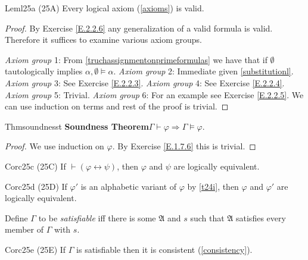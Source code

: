 \begin{reference}{Lem}{l25a}
  (25A) Every logical axiom (\ref{axioms}) is valid.
\end{reference}

\begin{proof}
  By Exercise \ref{E.2.2.6} any generalization of a valid formula is valid. Therefore it suffices to examine various axiom groups.

  \textit{Axiom group} 1: From \ref{truchassignmentonprimeformulas} we have that if $\emptyset$ tautologically implies $\alpha,\emptyset\vDash \alpha$.\newline
  \textit{Axiom group} 2: Immediate given \ref{substitutionl}.\newline
  \textit{Axiom group} 3: See Exercise \ref{E.2.2.3}.\newline
  \textit{Axiom group} 4: See Exercise \ref{E.2.2.4}.\newline
  \textit{Axiom group} 5: Trivial.\newline
  \textit{Axiom group} 6: For an example see Exercise \ref{E.2.2.5}. We can use induction on terms and rest of the proof is trivial.
\end{proof}

\begin{reference}{Thm}{soundnesst}
  \textbf{Soundness Theorem}\quad $\Gamma\vdash \varphi\Rightarrow \Gamma\vDash \varphi.$
\end{reference}

\begin{proof}
  We use induction on $\varphi$. By Exercise \ref{E.1.7.6} this is trivial.
\end{proof}

\begin{reference}{Cor}{c25c}
  (25C) If $\vdash(\varphi \leftrightarrow \psi)$, then $\varphi$ and $\psi$ are logically equivalent.
\end{reference}

\begin{reference}{Cor}{c25d}
  (25D) If $\varphi'$ is an alphabetic variant of $\varphi$ by \ref{t24i}, then $\varphi$ and $\varphi'$ are logically equivalent.
\end{reference}

Define $\Gamma$ to be \textit{satisfiable} iff there is some $\mathfrak{A}$ and $s$ such that $\mathfrak{A}$ satisfies every member of $\Gamma$ with $s$.

\begin{reference}{Cor}{c25e}
  (25E) If $\Gamma$ is satisfiable then it is consistent (\ref{consistency}).
\end{reference}

